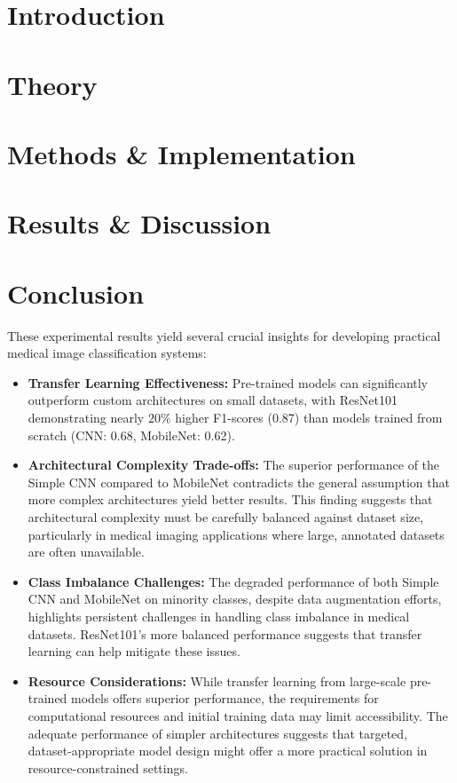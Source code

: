 \documentclass[aps,pra,english,notitlepage,reprint,nofootinbib]{revtex4-1}  %
\begin{document}
\section{Introduction}\label{sec:introduction}

% 

\section{Theory}\label{sec:theory}
% 

\section{Methods \& Implementation}\label{sec:methods}


\section{Results \& Discussion}\label{sec:results discussion}


\section{Conclusion}\label{sec:conclusion}

These experimental results yield several crucial insights for developing practical medical image classification systems:

\begin{itemize}
    \item \textbf{Transfer Learning Effectiveness:} Pre-trained models can significantly outperform custom architectures on small datasets,  with ResNet101 demonstrating nearly $20\%$ higher F1-scores (0.87) than models trained from scratch (CNN: 0.68, MobileNet: 0.62).
    \item \textbf{Architectural Complexity Trade-offs:} The superior performance of the Simple CNN compared to MobileNet contradicts the general assumption that more complex architectures yield better results. This finding suggests that architectural complexity must be carefully balanced against dataset size, particularly in medical imaging applications where large, annotated datasets are often unavailable.
    \item \textbf{Class Imbalance Challenges:} The degraded performance of both Simple CNN and MobileNet on minority classes, despite data augmentation efforts, highlights persistent challenges in handling class imbalance in medical datasets. ResNet101's more balanced performance suggests that transfer learning can help mitigate these issues.
    \item \textbf{Resource Considerations:} While transfer learning from large-scale pre-trained models offers superior performance, the requirements for computational resources and initial training data may limit accessibility. The adequate performance of simpler architectures suggests that targeted, dataset-appropriate model design might offer a more practical solution in resource-constrained settings.
\end{itemize}
\end{document}
